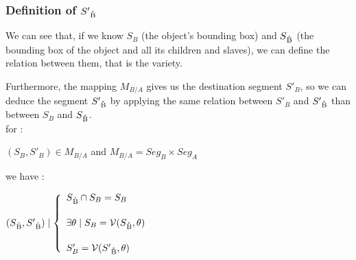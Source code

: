 \documentclass[a4paper]{article}
\newcommand{\variete}			{\ensuremath{\mathcal{V}}}
\begin{document}
\subsubsection{Definition of $S'\textsubscript{\r{B}}$}\label{subsubsec:defDestChildRect}

We can see that, if we know $S_B$ (the object's bounding box) and $S\textsubscript{\r{B}}$ (the bounding box of the object and all its children and slaves), we can define the relation between them, that is the variety. 

Furthermore, the mapping $M_{B/A}$ gives us the destination segment $S'_B$, so we can deduce the segment $S'\textsubscript{\r{B}}$ by applying the same relation between $S'_B$ and $S'\textsubscript{\r{B}}$ than between $S_B$ and $S\textsubscript{\r{B}}$.
\\

for : \begin{center} $(S_B, S'_B) \in M_{B/A}$ and $M_{B/A} = Seg_B \times Seg_A$ \end{center}

we have :

\begin{center}
$(S\textsubscript{\r{B}}, S'\textsubscript{\r{B}}) \mid \left\lbrace 
\begin{array}{lcl} 
S\textsubscript{\r{B}} \cap S_B = S_B\\ [0.5cm]
\exists \theta \mid S_B = \variete(S\textsubscript{\r{B}}, \theta)\\ [0.5cm]
S'_B = \variete(S'\textsubscript{\r{B}}, \theta)
\end{array}\right.$
\end{center}
\end{document}
